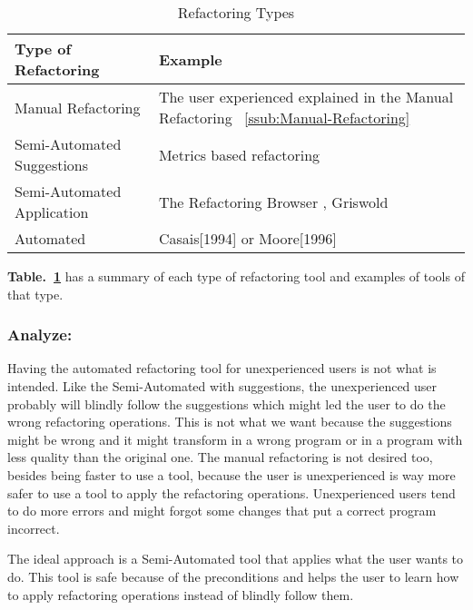 


\begin{table}[h]
\caption{Refactoring Types}
\label{tab-Refactoring-Types}
\begin{tabular}{|l|l|}
\hline
\textbf{Type of Refactoring} & \textbf{Example}                                                                             \\ \hline
Manual Refactoring           & The user experienced explained in the Manual Refactoring ~\ref{ssub:Manual-Refactoring}      \\ \hline
Semi-Automated Suggestions   & Metrics based refactoring \cite{simon2001metrics}                                            \\ \hline
Semi-Automated Application   & The Refactoring Browser \cite{roberts1997refactoring}, Griswold \cite{griswold1993automated} \\ \hline
Automated                    & Casais[1994] \cite{casais1994automatic} or Moore[1996] \cite{moore1996automatic}             \\ \hline
\end{tabular}
\end{table}



{\bf Table.~\ref{tab-Refactoring-Types}} has a summary of each type of refactoring tool and examples of tools of that type.

\subsubsection{Analyze:}
Having the automated refactoring tool for unexperienced users is not what is intended. Like the Semi-Automated with suggestions, the unexperienced user probably will blindly follow the suggestions which might led the user to do the wrong refactoring operations.
This is not what we want because the suggestions might be wrong and it might transform in a wrong program or in a program with less quality than the original one.
The manual refactoring is not desired too, besides being faster to use a tool, because the user is unexperienced is way more safer to use a tool to apply the refactoring operations. 
Unexperienced users tend to do more errors and might forgot some changes that put a correct program incorrect.

The ideal approach is a Semi-Automated tool that applies what the user wants to do. 
This tool is safe because of the preconditions and helps the user to learn how to apply refactoring operations instead of blindly follow them.

